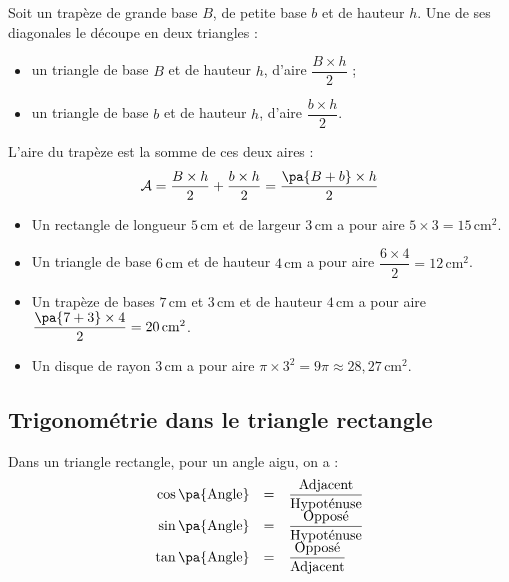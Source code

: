 \begin{demo}
	Soit un trapèze de grande base $B$, de petite base $b$ et de hauteur $h$. Une de ses diagonales le découpe en deux triangles :

	\begin{itemize}
		\item un triangle de base $B$ et de hauteur $h$, d'aire $\dfrac{B \times h}{2}$ ;
		\item un triangle de base $b$ et de hauteur $h$, d'aire $\dfrac{b \times h}{2}$.
	\end{itemize}

	L'aire du trapèze est la somme de ces deux aires :
	\[
		\mathcal{A} = \dfrac{B \times h}{2} + \dfrac{b \times h}{2} = \dfrac{\pa{B + b} \times h}{2}
	\]
\end{demo}

\begin{ex}
	\nline
	\begin{itemize}
		\item Un rectangle de longueur $5\,\text{cm}$ et de largeur $3\,\text{cm}$ a pour aire $5 \times 3 = 15\,\text{cm}^2$.
		\item Un triangle de base $6\,\text{cm}$ et de hauteur $4\,\text{cm}$ a pour aire $\dfrac{6 \times 4}{2} = 12\,\text{cm}^2$.
		\item Un trapèze de bases $7\,\text{cm}$ et $3\,\text{cm}$ et de hauteur $4\,\text{cm}$ a pour aire $\dfrac{\pa{7 + 3} \times 4}{2} = 20\,\text{cm}^2$.
		\item Un disque de rayon $3\,\text{cm}$ a pour aire $\pi \times 3^2 = 9\pi \approx 28{,}27\,\text{cm}^2$.
	\end{itemize}
\end{ex}

\subsection{Trigonométrie dans le triangle rectangle}

\begin{prop}
	Dans un triangle rectangle, pour un angle aigu, on a :
	\[
		\def\arraystretch{1.5}
		\begin{array}{rcl}
			\cos\pa{\text{Angle}} & = & \dfrac{\text{Adjacent}}{\text{Hypoténuse}} \\
			\sin\pa{\text{Angle}} & = & \dfrac{\text{Opposé}}{\text{Hypoténuse}}   \\
			\tan\pa{\text{Angle}} & = & \dfrac{\text{Opposé}}{\text{Adjacent}}
		\end{array}
	\]
\end{prop}

